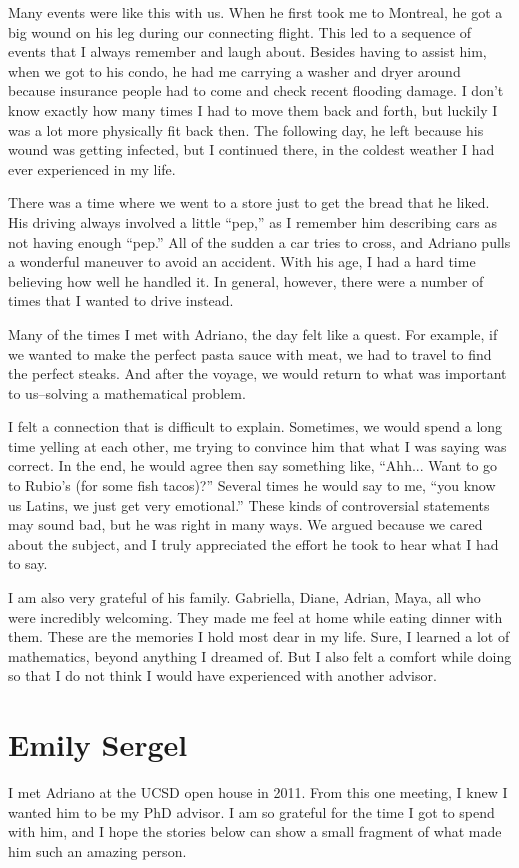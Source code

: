 \documentclass{amsart}
\begin{document}
Many events were like this with us. When he first took me to Montreal, he got a big wound on his leg during our connecting flight. This led to a sequence of events that I always remember and laugh about. Besides having to assist him, when we got to his condo, he had me carrying a washer and dryer around because insurance people had to come and check recent flooding damage. I don't know exactly how many times I had to move them back and forth, but luckily I was a lot more physically fit back then. 
The following day, he left because his wound was getting infected, but I continued there, in the coldest weather I had ever experienced in my life. 

There was a time where we went to a store just to get the bread that he liked. His driving always involved a little ``pep,'' as I remember him describing cars as not having enough ``pep.'' All of the sudden a car tries to cross, and Adriano pulls a wonderful maneuver to avoid an accident. With his age, I had a hard time believing how well he handled it. In general, however, there were a number of times that I wanted to drive instead.

Many of the times I met with Adriano, the day felt like a quest. For example, if we wanted to make the perfect pasta sauce with meat, we had to travel to find the perfect steaks. And after the voyage, we would return to what was important to us--solving a mathematical problem. 

I felt a connection that is difficult to explain. Sometimes, we would spend a long time yelling at each other, me trying to convince him that what I was saying was correct. In the end, he would agree then say something like, ``Ahh... Want to go to Rubio's (for some fish tacos)?'' Several times he would say to me, ``you know us Latins, we just get very emotional.'' These kinds of controversial statements may sound bad, but he was right in many ways. We argued because we cared about the subject, and I truly appreciated the effort he took to hear what I had to say. 

I am also very grateful of his family. Gabriella, Diane, Adrian, Maya, all who were incredibly welcoming. They made me feel at home while eating dinner with them. These are the memories I hold most dear in my life. Sure, I learned a lot of mathematics, beyond anything I dreamed of. But I also felt a comfort while doing so that I do not think I would have experienced with another advisor.

\section*{Emily Sergel}
I met Adriano at the UCSD open house in 2011. From this one meeting, I knew I wanted him to be my PhD advisor. I am so grateful for the time I got to spend with him, and I hope the stories below can show a small fragment of what made him such an amazing person.
\end{document}
